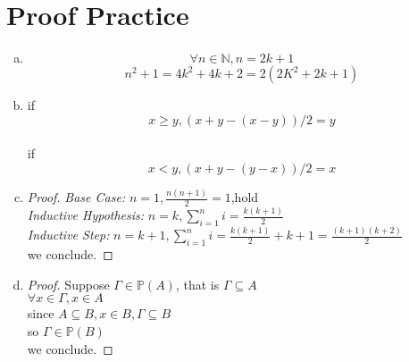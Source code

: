 \documentclass{article}
\newcommand{\powerset}[1]{\mathbb{P}(#1)}
\begin{document}
    \part*{Proof Practice}
    \begin{enumerate}[(a).]
        \item \[ \forall n \in \mathbb{N}, n = 2k+1 \]
        \[n^2+1 = 4k^2+4k+2 = 2(2K^2+2k+1)\]
        \item if \[ x \ge y, (x+y-(x-y))/2 = y \]\\
        if\[ x < y, (x+y-(y-x))/2 = x \]

        \item \begin{proof}
        
            \emph{Base Case: }$n=1,\frac{n(n+1)}{2}=1$,hold\\
            \emph{Inductive Hypothesis: }
            $n=k,\sum_{i=1}^{n}i=\frac{k(k+1)}{2}$\\
            \emph{Inductive Step: }
            $n=k+1,\sum_{i=1}^{n}i=\frac{k(k+1)}{2}+k+1=\frac{(k+1)(k+2)}{2}$\\
            we conclude.
        \end{proof}
        
        \item \begin{proof}
        
            Suppose $\Gamma \in \powerset{A}$, that is $\Gamma \subseteq A$\\
            $\forall x \in \Gamma, x \in A$\\
            since $A \subseteq B, x \in B, \Gamma \subseteq B$\\
            so $\Gamma \in \powerset{B}$\\
            we conclude.
            
        \end{proof}
    \end{enumerate}
\end{document}
